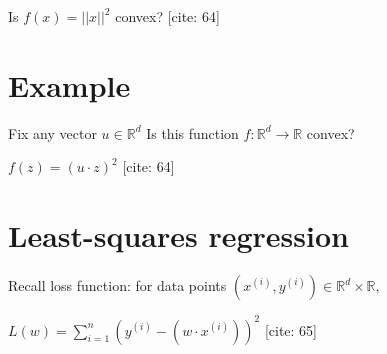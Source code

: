 \documentclass{article}
\begin{document}
Is $f(x)=||x||^{2}$ convex? [cite: 64]

\section{Example}

Fix any vector $u\in\mathbb{R}^{d}$ Is this function $f:\mathbb{R}^{d}\rightarrow\mathbb{R}$ convex?

$f(z)=(u\cdot z)^{2}$ [cite: 64]

\section{Least-squares regression}

Recall loss function: for data points $(x^{(i)},y^{(i)})\in\mathbb{R}^{d}\times\mathbb{R},$

$L(w)=\sum_{i=1}^{n}(y^{(i)}-(w\cdot x^{(i)}))^{2}$ [cite: 65]

\newpage
\end{document}
